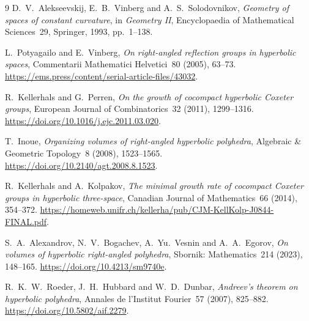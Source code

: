 \documentclass[11pt]{article}
\theoremstyle{remark}
\begin{document}
\begin{thebibliography}{9}
D.~V.~Alekseevskij, E.~B.~Vinberg and A.~S.~Solodovnikov,
\emph{Geometry of spaces of constant curvature}, in
\emph{Geometry II}, Encyclopaedia of Mathematical Sciences~29,
Springer, 1993, pp.~1--138.

L.~Potyagailo and E.~Vinberg,
\emph{On right-angled reflection groups in hyperbolic spaces},
Commentarii Mathematici Helvetici~80 (2005), 63--73.
\url{https://ems.press/content/serial-article-files/43032}.

R.~Kellerhals and G.~Perren,
\emph{On the growth of cocompact hyperbolic Coxeter groups},
European Journal of Combinatorics~32 (2011), 1299--1316.
\url{https://doi.org/10.1016/j.ejc.2011.03.020}.

T.~Inoue, \emph{Organizing volumes of right-angled hyperbolic polyhedra},
Algebraic \& Geometric Topology~8 (2008), 1523--1565.
\url{https://doi.org/10.2140/agt.2008.8.1523}.

R.~Kellerhals and A.~Kolpakov,
\emph{The minimal growth rate of cocompact Coxeter groups in hyperbolic
three-space}, Canadian Journal of Mathematics~66 (2014), 354--372.
\url{https://homeweb.unifr.ch/kellerha/pub/CJM-KellKolp-J0844-FINAL.pdf}.

S.~A.~Alexandrov, N.~V.~Bogachev, A.~Yu.~Vesnin and A.~A.~Egorov,
\emph{On volumes of hyperbolic right-angled polyhedra},
Sbornik: Mathematics~214 (2023), 148--165.
\url{https://doi.org/10.4213/sm9740e}.

R.~K.~W.~Roeder, J.~H.~Hubbard and W.~D.~Dunbar,
\emph{Andreev's theorem on hyperbolic polyhedra},
Annales de l'Institut Fourier~57 (2007), 825--882.
\url{https://doi.org/10.5802/aif.2279}.
\end{thebibliography}
\end{document}

